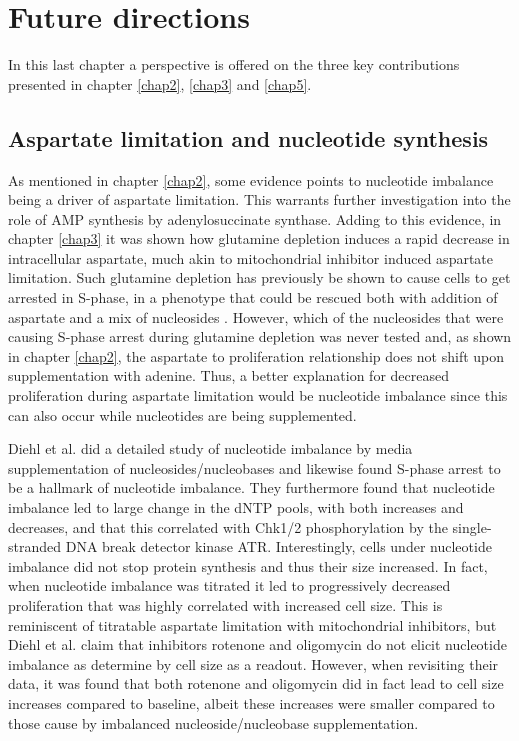 \chapter{Future directions}
\label{chap6}
In this last chapter a perspective is offered on the three key contributions presented in chapter \ref{chap2}, \ref{chap3} and \ref{chap5}.




\section{Aspartate limitation and nucleotide synthesis}
As mentioned in chapter \ref{chap2}, some evidence points to nucleotide imbalance being a driver of aspartate limitation.
This warrants further investigation into the role of AMP synthesis by adenylosuccinate synthase.
Adding to this evidence, in chapter \ref{chap3} it was shown how glutamine depletion induces a rapid decrease in intracellular aspartate, much akin to mitochondrial inhibitor induced aspartate limitation.
Such glutamine depletion has previously be shown to cause cells to get arrested in S-phase, in a phenotype that could be rescued both with addition of aspartate and a mix of nucleosides \cite{Patel2016-ms}.
However, which of the nucleosides that were causing S-phase arrest during glutamine depletion was never tested and, as shown in chapter \ref{chap2}, the aspartate to proliferation relationship does not shift upon supplementation with adenine.
Thus, a better explanation for decreased proliferation during aspartate limitation would be nucleotide imbalance since this can also occur while nucleotides are being supplemented.

Diehl et al. \cite{Diehl2022-gm} did a detailed study of nucleotide imbalance by media supplementation of nucleosides/nucleobases and likewise found S-phase arrest to be a hallmark of nucleotide imbalance.
They furthermore found that nucleotide imbalance led to large change in the dNTP pools, with both increases and decreases, and that this correlated with Chk1/2 phosphorylation by the single-stranded DNA break detector kinase ATR.
Interestingly, cells under nucleotide imbalance did not stop protein synthesis and thus their size increased.
In fact, when nucleotide imbalance was titrated it led to progressively decreased proliferation that was highly correlated with increased cell size.
This is reminiscent of titratable aspartate limitation with mitochondrial inhibitors, but Diehl et al. claim that inhibitors rotenone and oligomycin do not elicit nucleotide imbalance as determine by cell size as a readout.
However, when revisiting their data, it was found that both rotenone and oligomycin did in fact lead to cell size increases compared to baseline, albeit these increases were smaller compared to those cause by imbalanced nucleoside/nucleobase supplementation.


